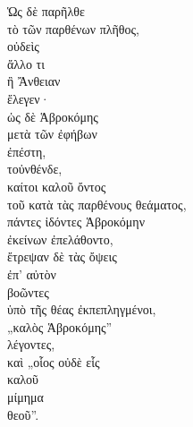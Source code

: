 {\large
\begin{greek}
\noindent Ὡς δὲ παρῆλθε \\
τὸ τῶν παρθένων πλῆθος, \\
οὐδεὶς \\
\tabto{2em} ἄλλο τι \\
\tabto{2em} ἢ Ἄνθειαν \\
ἔλεγεν· \\
ὡς δὲ Ἁβροκόμης \\
\tabto{2em} μετὰ τῶν ἐφήβων \\
ἐπέστη, \\
τοὐνθένδε, \\
καίτοι καλοῦ ὄντος \\
\tabto{2em} τοῦ κατὰ τὰς παρθένους θεάματος, \\
πάντες ἰδόντες Ἁβροκόμην \\
ἐκείνων ἐπελάθοντο, \\
ἔτρεψαν δὲ τὰς ὄψεις \\
\tabto{2em} ἐπ' αὐτὸν \\
βοῶντες \\
\tabto{2em} ὑπὸ τῆς θέας ἐκπεπληγμένοι, \\
\tabto{2em} „καλὸς Ἁβροκόμης”\\
λέγοντες, \\
καὶ „οἷος οὐδὲ εἷς \\
\tabto{4em} καλοῦ \\
\tabto{2em} μίμημα \\
\tabto{4em} θεοῦ”.\\

\end{greek}
}


